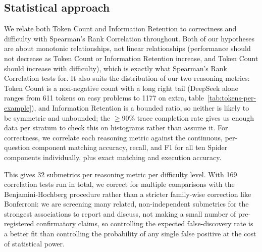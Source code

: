 \subsection{Statistical approach}
\label{sec:rq2-statistical-approach}

We relate both Token Count and Information Retention to correctness and difficulty with Spearman's Rank Correlation throughout. Both of our hypotheses are about monotonic relationships, not linear relationships (performance should not decrease as Token Count or Information Retention increase, and Token Count should increase with difficulty), which is exactly what Spearman's Rank Correlation tests for. It also suits the distribution of our two reasoning metrics: Token Count is a non-negative count with a long right tail (DeepSeek alone ranges from 611 tokens on easy problems to 1177 on extra, table~\ref{tab:tokens-per-example}), and Information Retention is a bounded ratio, so neither is likely to be symmetric and unbounded; the $\geq$90\% trace completion rate gives us enough data per stratum to check this on histograms rather than assume it. For correctness, we correlate each reasoning metric against the continuous, per-question component matching accuracy, recall, and F1 for all ten Spider components individually, plus exact matching and execution accuracy.

This gives 32 submetrics per reasoning metric per difficulty level. With 169 correlation tests run in total, we correct for multiple comparisons with the Benjamini-Hochberg procedure rather than a stricter family-wise correction like Bonferroni: we are screening many related, non-independent submetrics for the strongest associations to report and discuss, not making a small number of pre-registered confirmatory claims, so controlling the expected false-discovery rate is a better fit than controlling the probability of any single false positive at the cost of statistical power.



